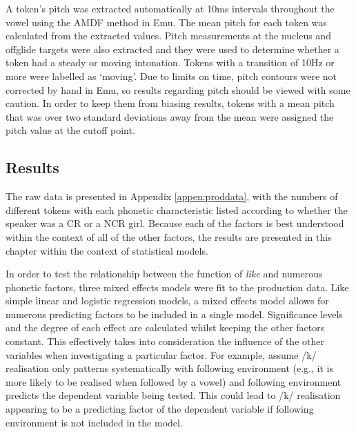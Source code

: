 A token's pitch was extracted automatically at 10ms intervals throughout the vowel using the AMDF method in Emu. The mean pitch for each token was calculated from the extracted values. Pitch measurements at the nucleus and offglide targets were also extracted and they were used to determine whether a token had a steady or moving intonation. Tokens with a transition of 10Hz or more were labelled as `moving'. Due to limits on time, pitch contours were not corrected by hand in Emu, so results regarding pitch should be viewed with some caution. In order to keep them from biasing results, tokens with a mean pitch that was over two standard deviations away from the mean were assigned the pitch value at the cutoff point. 



\subsection{Results}\label{sec:prodresults}

The raw data is presented in Appendix \ref{appen:proddata}, with the numbers of different tokens with each phonetic characteristic listed according to whether the speaker was a CR or a NCR girl. Because each of the factors is best understood within the context of all of the other factors, the results are presented in this chapter within the context of statistical models.

In order to test the relationship between the function of \textit{like} and numerous phonetic factors, three mixed effects models were fit to the production data. Like simple linear and logistic regression models, a mixed effects model allows for numerous predicting factors to be included in a single model. Significance levels and the degree of each effect are calculated whilst keeping the other factors constant. This effectively takes into consideration the influence of the other variables when investigating a particular factor. For example, assume /k/ realisation only patterns systematically with following environment (e.g., it is more likely to be realised when followed by a vowel) and following environment predicts the dependent variable being tested. This could lead to /k/ realisation appearing to be a predicting factor of the dependent variable if following environment is not included in the model. 

